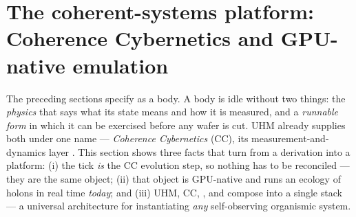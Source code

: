 \section{The coherent-systems platform: Coherence Cybernetics and GPU-native emulation}
\label{sec:platform}

The preceding sections specify \TALOS{} as a body. A body is idle without two
things: the \emph{physics} that says what its state means and how it is measured,
and a \emph{runnable form} in which it can be exercised before any wafer is cut.
UHM already supplies both under one name --- \emph{Coherence Cybernetics} (CC),
its measurement-and-dynamics layer \cite{uhm2026}. This section shows three facts
that turn \TALOS{} from a derivation into a platform: (i) the \TALOS{} tick
\emph{is} the CC evolution step, so nothing has to be reconciled --- they are the
same object; (ii) that object is GPU-native and runs an ecology of holons in
real time \emph{today}; and (iii) UHM, CC, \SYNARC{}, and \TALOS{} compose into a
single stack --- a universal architecture for instantiating \emph{any}
self-observing organismic system.

